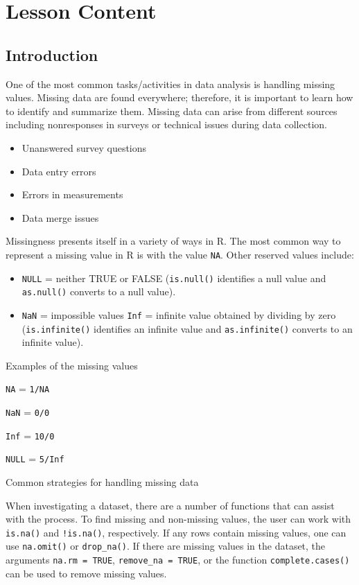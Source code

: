 \documentclass[
  letterpaper,
  DIV=11,
  numbers=noendperiod]{scrreprt}
\providecommand{\tightlist}{%
  \setlength{\itemsep}{0pt}\setlength{\parskip}{0pt}}\usepackage{longtable,booktabs,array}
\begin{document}
\section{Lesson Content}\label{lesson-content-11}

\subsection{Introduction}\label{introduction-9}

One of the most common tasks/activities in data analysis is handling
missing values. Missing data are found everywhere; therefore, it is
important to learn how to identify and summarize them. Missing data can
arise from different sources including nonresponses in surveys or
technical issues during data collection.

\begin{itemize}
\tightlist
\item
  Unanswered survey questions
\item
  Data entry errors
\item
  Errors in measurements
\item
  Data merge issues
\end{itemize}

Missingness presents itself in a variety of ways in R. The most common
way to represent a missing value in R is with the value \texttt{NA}.
Other reserved values include:

\begin{itemize}
\item
  \texttt{NULL} = neither TRUE or FALSE (\texttt{is.null()} identifies a
  null value and \texttt{as.null()} converts to a null value).
\item
  \texttt{NaN} = impossible values \texttt{Inf} = infinite value
  obtained by dividing by zero (\texttt{is.infinite()} identifies an
  infinite value and \texttt{as.infinite()} converts to an infinite
  value).
\end{itemize}

Examples of the missing values

\texttt{NA} = \texttt{1/NA}

\texttt{NaN} = \texttt{0/0}

\texttt{Inf} = \texttt{10/0}

\texttt{NULL} = \texttt{5/Inf}

Common strategies for handling missing data

When investigating a dataset, there are a number of functions that can
assist with the process. To find missing and non-missing values, the
user can work with \texttt{is.na()} and \texttt{!is.na()}, respectively.
If any rows contain missing values, one can use \texttt{na.omit()} or
\texttt{drop\_na()}. If there are missing values in the dataset, the
arguments \texttt{na.rm\ =\ TRUE}, \texttt{remove\_na\ =\ TRUE}, or the
function \texttt{complete.cases()} can be used to remove missing values.
\end{document}
